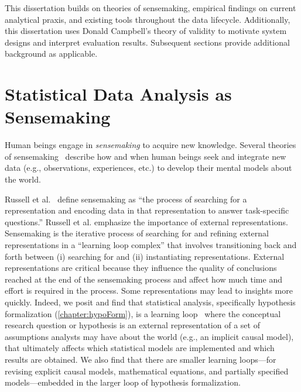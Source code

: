 This dissertation builds on theories of sensemaking, empirical findings on
current analytical praxis, and existing tools throughout the data lifecycle.
Additionally, this dissertation uses Donald Campbell's theory of validity to
motivate system designs and interpret evaluation results. Subsequent sections
provide additional background as applicable.

\section{Statistical Data Analysis as Sensemaking}
Human beings engage in \textit{sensemaking} to acquire new knowledge. Several
theories of
sensemaking~\cite{pirolli2005sensemaking,russell1993cost,klein2007dataFrame}
describe how and when human beings seek and integrate new data (e.g.,
observations, experiences, etc.) to develop their mental models about the world.

Russell et al.~\cite{russell1993cost} define sensemaking as ``the process of
searching for a representation and encoding data in that representation to
answer task-specific questions.'' Russell et al. emphasize the importance of
external representations. Sensemaking is the iterative process of searching for
and refining external representations in a ``learning loop complex'' that
involves transitioning back and forth between (i) searching for and (ii)
instantiating representations. External representations are critical because
they influence the quality of conclusions reached at the end of the sensemaking
process and affect how much time and effort is required in the process. Some
representations may lead to insights more quickly. Indeed, we posit and find
that statistical analysis, specifically hypothesis formalization
(\autoref{chapter:hypoForm}), is a learning loop~\cite{russell1993cost} where
the conceptual research question or hypothesis is an external representation of
a set of assumptions analysts may have about the world (e.g., an implicit causal
model), that ultimately affects which statistical models are implemented and
which results are obtained. We also find that there are smaller learning
loops---for revising explicit causal models, mathematical equations, and
partially specified models---embedded in the larger loop of hypothesis
formalization.

